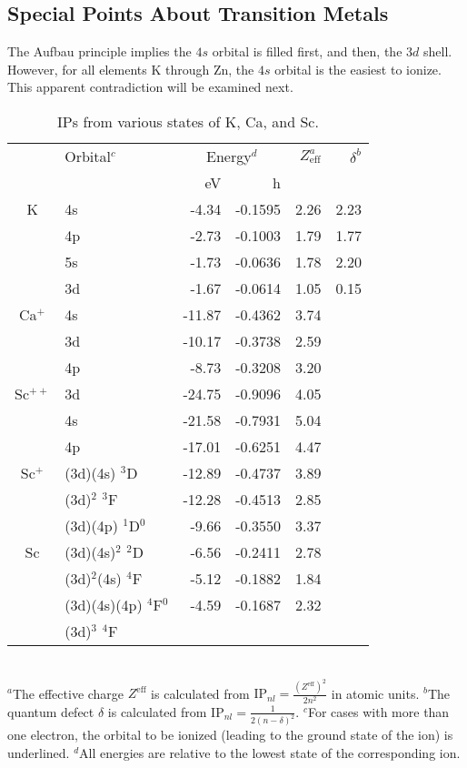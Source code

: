 \subsection{Special Points About Transition Metals}

The Aufbau principle implies the $4s$ orbital is filled first, and 
then, the $3d$ shell.  However, for all elements K through Zn, the 
$4s$ 
orbital is the easiest to ionize.  This apparent contradiction will be 
examined next.

\begin{table}
\caption{IPs from various states of K, Ca, and Sc.}
\label{chap5-table8}

\begin{tabular}{clrrrr}\\ \hline
& Orbital$^c$ & \multicolumn{2}{c}{Energy$^d$} & $Z_\mathrm{eff}^a$ &
$\delta^b$ \\
& & eV & h \\
K   & 4s & -4.34 & -0.1595 & 2.26 & 2.23 \\
    & 4p & -2.73 & -0.1003 & 1.79 & 1.77 \\
    & 5s & -1.73 & -0.0636 & 1.78 & 2.20 \\
    & 3d & -1.67 & -0.0614 & 1.05 & 0.15 \\
Ca$^+$ & 4s & -11.87 & -0.4362 & 3.74 \\
       & 3d & -10.17 & -0.3738 & 2.59 \\
       & 4p & -8.73  & -0.3208 & 3.20 \\
Sc$^{++}$ & 3d & -24.75 & -0.9096 & 4.05 \\
          & 4s & -21.58 & -0.7931 & 5.04 \\
          & 4p & -17.01 & -0.6251 & 4.47 \\
Sc$^+$    & (3d)(4s) $^3$D & -12.89 & -0.4737 & 3.89 \\
          & (3d)$^2$ $^3$F & -12.28 & -0.4513 & 2.85 \\
	  & (3d)(4p) $^1$D$^0$ & -9.66 & -0.3550 & 3.37 \\
Sc	  & (3d)(4s)$^2$ $^2$D & -6.56 & -0.2411 & 2.78 \\
          & (3d)$^2$(4s) $^4$F & -5.12 & -0.1882 & 1.84 \\
	  & (3d)(4s)(4p) $^4$F$^0$ & -4.59 & -0.1687 & 2.32 \\
	  & (3d)$^3$ $^4$F \\
\hline
\end{tabular}\\
$^a$The effective charge $Z^\mathrm{eff}$ is calculated from 
$\mathrm{IP}_{nl} = \frac{(Z^\mathrm{eff})^2}{2n^2}$ in atomic units.
$^b$The quantum defect $\delta$ is calculated from 
$\mathrm{IP}_{nl} = \frac{1}{2(n-\delta)^2}$.
$^c$For cases with more than one electron, the orbital to be ionized
(leading to the ground state of the ion) is underlined.
$^d$All energies are relative to the lowest state of the corresponding
ion.
\end{table}

